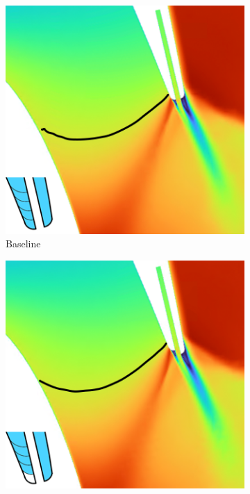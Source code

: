 \documentclass[a4paper, 11pt, oneside]{report}
\begin{document}
\begin{figure}[H]
	\centering
	\begin{subfigure}{.42\textwidth}
		\centering
		\includegraphics[width=\linewidth]{figs/ps_cutbacks_choked_0.png}
		\caption{Baseline}
		\vspace{0.018\textheight}
	\end{subfigure}
	\hspace{0.05\textwidth}
	\begin{subfigure}{.42\textwidth}
		\centering
		\includegraphics[width=\linewidth]{figs/ps_cutbacks_choked_25.png}

\end{subfigure}
\end{figure}
\end{document}
